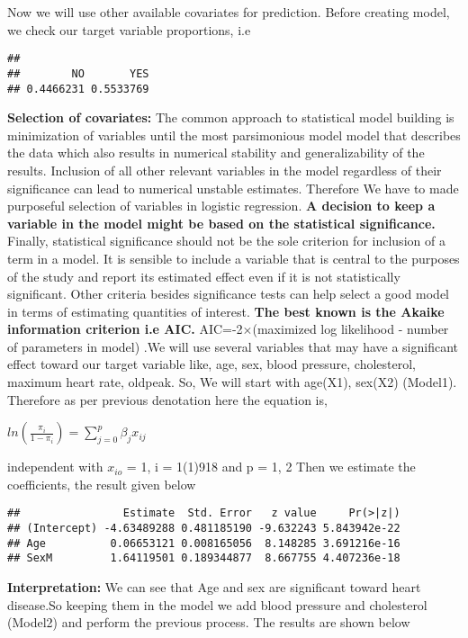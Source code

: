 \documentclass[
]{article}
\begin{document}
Now we will use other available covariates for prediction. Before
creating model, we check our target variable proportions, i.e

\begin{verbatim}
## 
##        NO       YES 
## 0.4466231 0.5533769
\end{verbatim}

\textbf{Selection of covariates:} The common approach to statistical
model building is minimization of variables until the most parsimonious
model model that describes the data which also results in numerical
stability and generalizability of the results. Inclusion of all other
relevant variables in the model regardless of their significance can
lead to numerical unstable estimates. Therefore We have to made
purposeful selection of variables in logistic regression. \textbf{A
decision to keep a variable in the model might be based on the
statistical significance.} Finally, statistical significance should not
be the sole criterion for inclusion of a term in a model. It is sensible
to include a variable that is central to the purposes of the study and
report its estimated effect even if it is not statistically significant.
Other criteria besides significance tests can help select a good model
in terms of estimating quantities of interest. \textbf{The best known is
the Akaike information criterion i.e AIC.} AIC=-2×(maximized log
likelihood - number of parameters in model) .We will use several
variables that may have a significant effect toward our target variable
like, age, sex, blood pressure, cholesterol, maximum heart rate,
oldpeak. So, We will start with age(X1), sex(X2) (Model1). Therefore as
per previous denotation here the equation is,

\(ln \left(\frac{\pi_i}{1-\pi_i} \right) = \sum_{j=0}^{p}\beta_j x_{ij}\)

independent with \(x_{io}\) = 1, i = 1(1)918 and p = 1, 2 Then we
estimate the coefficients, the result given below

\begin{verbatim}
##                Estimate  Std. Error   z value     Pr(>|z|)
## (Intercept) -4.63489288 0.481185190 -9.632243 5.843942e-22
## Age          0.06653121 0.008165056  8.148285 3.691216e-16
## SexM         1.64119501 0.189344877  8.667755 4.407236e-18
\end{verbatim}

\textbf{Interpretation:} We can see that Age and sex are significant
toward heart disease.So keeping them in the model we add blood pressure
and cholesterol (Model2) and perform the previous process. The results
are shown below
\end{document}
